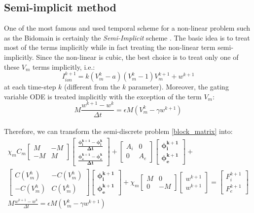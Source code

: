 \documentclass[a4paper,11pt]{article}
\begin{document}
\subsection{Semi-implicit method}
One of the most famous and used temporal scheme for a non-linear problem such as the Bidomain is certainly the \emph{Semi-Implicit} scheme \cite{acta}. The basic idea is to treat most of the terms implicitly while in fact treating the non-linear term semi-implicitly. Since the non-linear is cubic, the best choice is to treat only one of these $V_m$ terms implicitly, i.e.:
\begin{equation*}
I_{ion}^{k+1}=k(V_m^k-a)(V_m^k-1)V_m^{k+1}+w^{k+1}
\end{equation*}
at each time-step $k$ (different from the $k$ parameter). 
Moreover, the gating variable ODE is treated implicitly with the exception of the term $V_m$:
\begin{equation*}
M \frac{w^{k+1}-w^k}{\Delta t}=\epsilon M (V_m^k-\gamma w^{k+1})
\end{equation*}
\vspace{5mm} \\
Therefore, we can transform the semi-discrete problem \ref{block_matrix} into:
\begin{equation}
 \begin{gathered}
 \chi_mC_m \begin{bmatrix}M &-M \\ -M & M \end{bmatrix}
	\begin{bmatrix}\bm{\frac{\phi_i^{k+1}-\phi_i^{k}}{\Delta t}} \\ \bm{\frac{\phi_e^{k+1}-\phi_e^{k}}{\Delta t}}  \end{bmatrix}
	 + \begin{bmatrix}A_i & 0 \\ 0 & A_e \end{bmatrix}
	 \begin{bmatrix}\bm{\phi_i^{k+1}} \\ \bm{\phi_e^{k+1}} \end{bmatrix} +\\
	   \begin{bmatrix}C(V_m^h) & -C(V_m^h) \\ -C(V_m^h) & C(V_m^h) \end{bmatrix} 
	   \begin{bmatrix} \bm{\phi_i^{k+1}} \\ \bm{\phi_e^{k+1}}  \end{bmatrix} 
	   +\chi_m \begin{bmatrix}M & 0 \\ 0 & -M \end{bmatrix} 
	   	\begin{bmatrix}w^{k+1} \\ w^{k+1} \end{bmatrix} = 
	   	\begin{bmatrix} F_i^{k+1} \\ F_e^{k+1}\end{bmatrix}\\
	   M \frac{w^{k+1}-w^k}{\Delta t}=\epsilon M (V_m^k-\gamma w^{k+1})
\end{gathered}
\end{equation}\\
\end{document}

